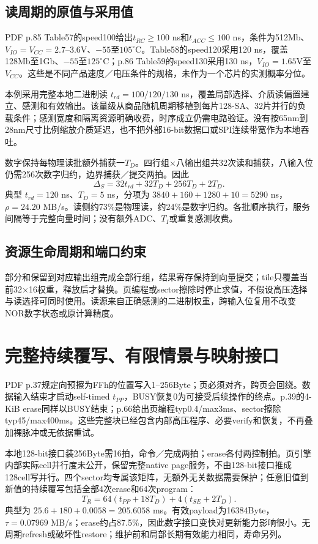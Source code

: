 \subsection{读周期的原值与采用值}
 PDF p.85 Table57的speed100给出$t_{RC}\ge100$ ns和$t_{ACC}\le100$ ns，条件为512Mb、$V_{IO}=V_{CC}=2.7$--3.6V、$-55$至$105^\circ$C。Table58的speed120采用120 ns，覆盖128Mb至1Gb、$-55$至$125^\circ$C；p.86 Table59的speed130采用130 ns，$V_{IO}=1.65$V至$V_{CC}$。这些是不同产品速度／电压条件的规格，未作为一个芯片的实测概率分位。

本例采用完整本地二进制读 $t_{rd}=100/120/130$ ns，覆盖局部选择、介质读偏置建立、感测和有效输出。该量级从商品随机周期移植到每片128-SA、32片并行的负载条件；感测宽度和隔离资源明确收费，时序成立仍需电路验证。没有按65nm到28nm尺寸比例缩放介质延迟，也不把外部16-bit数据口或SPI连续带宽作为本地吞吐。

数字保持每物理读批额外捕获一$T_D$。四行组×八输出组共32次读和捕获，八输入位仍需256次数字归约，边界捕获／提交两拍。因此
\[
\boxed{\Delta_S=32t_{rd}+32T_D+256T_D+2T_D.}
\]
典型 $t_{rd}=120$ ns、$T_D=5$ ns，分项为 $3840+160+1280+10=5290$ ns，$\rho=24.20$ MB/s。读侧约73\%是物理读，约24\%是数字归约。各批顺序执行，服务间隔等于完整向量时间；没有额外ADC、$T_I$或重复感测收费。

\subsection{资源生命周期和端口约束}
部分和保留到对应输出组完成全部行组，结果寄存保持到向量提交；tile只覆盖当前32×16权重，释放后才替换。页编程或sector擦除时停止求值，不假设高压选择与读选择可同时使用。读源来自正确感测的二进制权重，跨输入位复用不改变NOR数字状态或原计算精度。

\clearpage
\section{完整持续覆写、有限情景与映射接口}

 PDF p.37规定向预擦为FFh的位置写入1--256Byte；页必须对齐，跨页会回绕。数据输入结束才启动self-timed $t_{PP}$，BUSY恢复0为可接受后续操作的终点。p.39的4-KiB erase同样以BUSY结束；p.66给出页编程typ0.4/max3ms、sector擦除typ45/max400ms。这些完整块已经包含内部高压程序、必要verify和恢复，不再叠加裸脉冲或无依据重试。

本地128-bit接口装256Byte需16拍，命令／完成两拍；erase各付两控制拍。页引擎内部实际cell并行度未公开，保留完整native page服务，不由128-bit接口推成128cell写并行。四个sector均专属该矩阵，无额外无关数据需要保护；任意旧值到新值的持续覆写包括全部4次erase和64次program：
\[
\boxed{T_R=64(t_{PP}+18T_D)+4(t_{SE}+2T_D).}
\]
典型为 $25.6+180+0.0058=205.6058$ ms。有效payload为16384Byte，$\tau=0.07969$ MB/s；erase约占87.5\%，因此数字接口变快对更新能力影响很小。无周期refresh或破坏性restore；维护前和局部长期有效能力相同，寿命另列。

